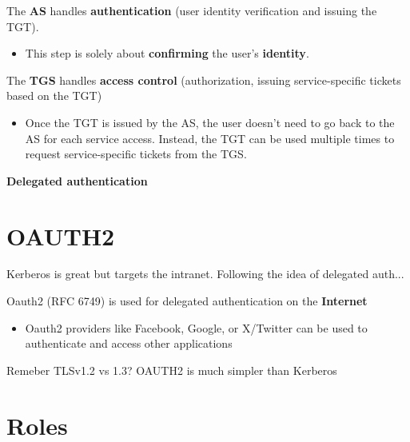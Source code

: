 \documentclass[11pt]{article}
\begin{document}
The \textbf{AS} handles \textbf{authentication} (user identity verification and issuing the TGT).
\begin{itemize}
	\item This step is solely about \textbf{confirming} the user's \textbf{identity}.
\end{itemize}

The \textbf{TGS} handles \textbf{access control} (authorization, issuing service-specific tickets based on the TGT)

\begin{itemize}
	\item Once the TGT is issued by the AS, the user doesn't need to go back to the AS for each service access. Instead, the TGT can be used multiple times to request service-specific tickets from the TGS.
\end{itemize}

\newpage

\begin{center}
  {\LARGE \textbf{Delegated authentication}}
\end{center}

\vspace{1cm}

\section*{OAUTH2}

Kerberos is great but targets the intranet. Following the idea of delegated auth... 

Oauth2 (RFC 6749) is used for delegated authentication on the \textbf{Internet}

\begin{itemize}
	\item Oauth2 providers like Facebook, Google, or X/Twitter can be used to authenticate and access other applications
\end{itemize}

\begin{tcolorbox}[
  colback=orange!15,     %
  colframe=black!50,    %
  boxrule=1pt,       %
  arc=3mm,             %
  left=4mm, right=4mm, top=2mm, bottom=2mm %
]
Remeber TLSv1.2 vs 1.3? OAUTH2 is much simpler than Kerberos
\end{tcolorbox}

\section*{Roles}
\end{document}
